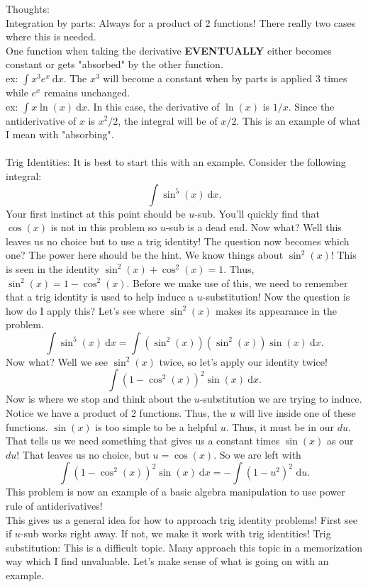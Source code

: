 \documentclass[10pt]{article}
\newcommand{\dx}{\:\mathrm{d}x}
\theoremstyle{Theorem}
\theoremstyle{definition}
\theoremstyle{remark}
\theoremstyle{custom}
\begin{document}
\thispagestyle{firststyle}
\pagestyle{plain}


Thoughts:\\
Integration by parts: Always for a product of 2 functions! There really two cases where this is needed.\\
One function when taking the derivative \textbf{EVENTUALLY} either becomes constant or gets "absorbed" by the other function.\\
ex: $\int x^3e^x \dx$. The $x^3$ will become a constant when by parts is applied 3 times while $e^x$ remains unchanged.\\
ex: $\int x\ln(x) \dx$. In this case, the derivative of $\ln(x)$ is $1/x$. Since the antiderivative of $x$ is $x^2/2$, the integral will be of $x/2$. This is an example of what I mean with "absorbing".\\\\
Trig Identities: It is best to start this with an example. Consider the following integral:
$$\int \sin^5(x) \dx.$$
Your first instinct at this point should be $u$-sub.  You'll quickly find that $\cos(x)$ is not in this problem so $u$-sub is a dead end. Now what? Well this leaves us no choice but to use a trig identity! The question now becomes which one? The power here should be the hint.  We know things about $\sin^2(x)$! This is seen in the identity $\sin^2(x)+\cos^2(x)=1$. Thus, $\sin^2(x)=1-\cos^2(x)$.  Before we make use of this, we need to remember that a trig identity is used to help induce a $u$-substitution! Now the question is how do I apply this? Let's see where $\sin^2(x)$ makes its appearance in the problem.
$$\int \sin^5(x) \dx=\int (\sin^2(x))(\sin^2(x))\sin(x) \dx.$$
Now what? Well we see $\sin^2(x)$ twice, so let's apply our identity twice!
$$\int (1-\cos^2(x))^2\sin(x) \dx.$$
Now is where we stop and think about the $u$-substitution we are trying to induce. Notice we have a product of 2 functions. Thus, the $u$ will live inside one of these functions. $\sin(x)$ is too simple to be a helpful $u$. Thus, it must be in our $du$. That tells us we need something that gives us a constant times $\sin(x)$ as our $du$! That leaves us no choice, but $u=\cos(x)$. So we are left with 
$$\int (1-\cos^2(x))^2\sin(x) \dx=-\int (1-u^2)^2 \text{ d}u .$$
This problem is now an example of a basic algebra manipulation to use power rule of antiderivatives!\\ This gives us a general idea for how to approach trig identity problems! First see if $u$-sub works right away. If not, we make it work with trig identities!
\newpage
Trig substitution: This is a difficult topic. Many approach this topic in a memorization way which I find unvaluable.  Let's make sense of what is going on with an example.  
\end{document}
